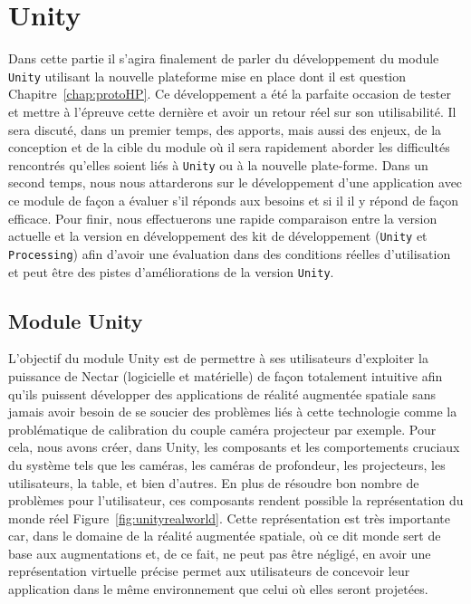 \chapter{Unity}

Dans cette partie il s'agira finalement de parler du développement du module \texttt{Unity} utilisant la nouvelle plateforme mise en place dont il est question Chapitre~\ref{chap:protoHP}. Ce développement a été la parfaite occasion de tester et mettre à l'épreuve cette dernière et avoir un retour réel sur son utilisabilité.
Il sera discuté, dans un premier temps, des apports, mais aussi des enjeux, de la conception et de la cible du module où il sera rapidement aborder les difficultés rencontrés qu'elles soient liés à \texttt{Unity} ou à la nouvelle plate-forme. 
Dans un second temps, nous nous attarderons sur le développement d'une application avec ce module de façon a évaluer s'il réponds aux besoins et si il il y répond de façon efficace.
Pour finir, nous effectuerons une rapide comparaison entre la version actuelle et la version en développement des kit de développement (\texttt{Unity} et \texttt{Processing}) afin d'avoir une évaluation dans des conditions réelles d'utilisation et peut être des pistes d'améliorations de la version \texttt{Unity}.

\section{Module Unity}

L'objectif du module Unity est de permettre à ses utilisateurs d'exploiter la puissance de Nectar (logicielle et matérielle) de façon totalement intuitive afin qu'ils puissent développer des applications de réalité augmentée spatiale sans jamais avoir besoin de se soucier des problèmes liés à cette technologie comme la problématique de calibration du couple caméra projecteur par exemple.
Pour cela, nous avons créer, dans Unity, les composants et les comportements cruciaux du système tels que les caméras, les caméras de profondeur, les projecteurs, les utilisateurs, la table, et bien d'autres. En plus de résoudre bon nombre de problèmes pour l'utilisateur, ces composants rendent possible la représentation du monde réel Figure~\ref{fig:unityrealworld}. Cette représentation est très importante car, dans le domaine de la réalité augmentée spatiale, où ce dit monde sert de base aux augmentations et, de ce fait, ne peut pas être négligé, en avoir une représentation virtuelle précise permet aux utilisateurs de concevoir leur application dans le même environnement que celui où elles seront projetées.

